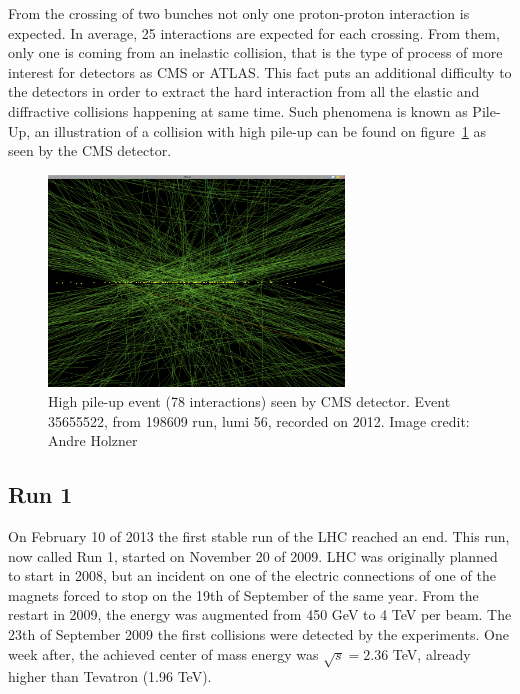 From the crossing of two bunches not only one proton-proton interaction is expected. In average, 25 interactions are expected for each crossing. From them, only one is coming from an inelastic collision, that is the type of process of more interest for detectors as CMS or ATLAS. This fact puts an additional difficulty to the detectors in order to extract the hard interaction from all the elastic and diffractive collisions happening at same time. Such phenomena is known as Pile-Up, an illustration of a collision with high pile-up can be found on figure~\ref{fig:pileup} as seen by the CMS detector.

\begin{figure}[!Hhtbp]
  \begin{center}
    \includegraphics[width=0.7\textwidth]{figs/pileup.png}
    \caption{High pile-up event (78 interactions) seen by CMS detector. Event 35655522, from 198609 run, lumi 56, recorded on 2012. Image credit: Andre Holzner }
    \label{fig:pileup}
  \end{center}
\end{figure}

\subsection{Run 1}
\label{sec:run1}

On February 10 of 2013 the first stable run of the LHC reached an end. This run, now called Run 1, started on November 20 of 2009. LHC was originally planned to start in 2008, but an incident on one of the electric connections of one of the magnets forced to stop on the 19th of September of the same year. From the restart in 2009, the energy was augmented from 450 GeV to 4 TeV per beam. The 23th of September 2009 the first collisions were detected by the experiments. One week after, the achieved center of mass energy was $\sqrt{s}=2.36$ TeV, already higher than Tevatron (1.96 TeV).

